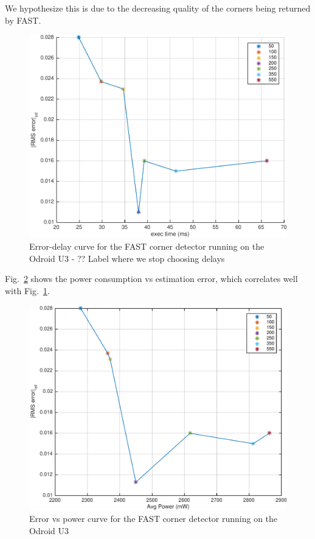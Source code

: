We hypothesize this is due to the decreasing quality of the corners being returned by FAST.
\begin{figure}[t]
\centering
\includegraphics[width=0.9\columnwidth]{figures/init_eps_delta_90th}
\caption{Error-delay curve for the FAST corner detector running on the Odroid U3 - ?? Label where we stop choosing delays}
\label{fig:fast}
\end{figure}

Fig.~\ref{fig:fastErrVsPower} shows the power consumption vs estimation error, which correlates well with Fig.~\ref{fig:fast}.
\begin{figure}[t]
	\centering
	\includegraphics[width=0.9\columnwidth]{figures/errVsPower}
	\caption{Error vs power curve for the FAST corner detector running on the Odroid U3}
	\label{fig:fastErrVsPower}
\end{figure}
